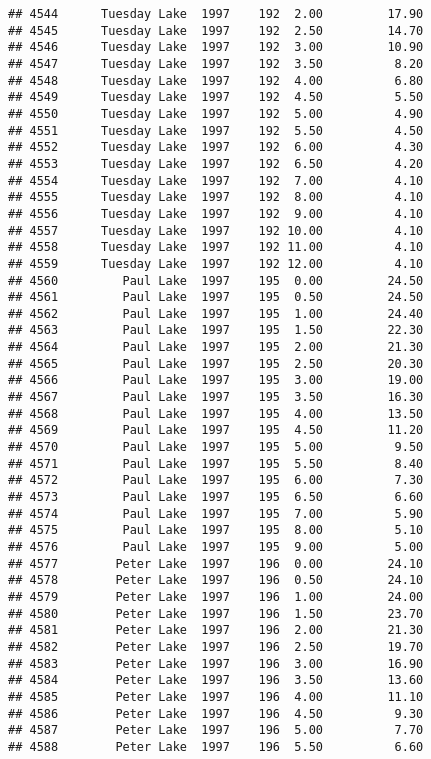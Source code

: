 \documentclass[
]{article}
\begin{document}
\begin{verbatim}
## 4544      Tuesday Lake  1997    192  2.00         17.90
## 4545      Tuesday Lake  1997    192  2.50         14.70
## 4546      Tuesday Lake  1997    192  3.00         10.90
## 4547      Tuesday Lake  1997    192  3.50          8.20
## 4548      Tuesday Lake  1997    192  4.00          6.80
## 4549      Tuesday Lake  1997    192  4.50          5.50
## 4550      Tuesday Lake  1997    192  5.00          4.90
## 4551      Tuesday Lake  1997    192  5.50          4.50
## 4552      Tuesday Lake  1997    192  6.00          4.30
## 4553      Tuesday Lake  1997    192  6.50          4.20
## 4554      Tuesday Lake  1997    192  7.00          4.10
## 4555      Tuesday Lake  1997    192  8.00          4.10
## 4556      Tuesday Lake  1997    192  9.00          4.10
## 4557      Tuesday Lake  1997    192 10.00          4.10
## 4558      Tuesday Lake  1997    192 11.00          4.10
## 4559      Tuesday Lake  1997    192 12.00          4.10
## 4560         Paul Lake  1997    195  0.00         24.50
## 4561         Paul Lake  1997    195  0.50         24.50
## 4562         Paul Lake  1997    195  1.00         24.40
## 4563         Paul Lake  1997    195  1.50         22.30
## 4564         Paul Lake  1997    195  2.00         21.30
## 4565         Paul Lake  1997    195  2.50         20.30
## 4566         Paul Lake  1997    195  3.00         19.00
## 4567         Paul Lake  1997    195  3.50         16.30
## 4568         Paul Lake  1997    195  4.00         13.50
## 4569         Paul Lake  1997    195  4.50         11.20
## 4570         Paul Lake  1997    195  5.00          9.50
## 4571         Paul Lake  1997    195  5.50          8.40
## 4572         Paul Lake  1997    195  6.00          7.30
## 4573         Paul Lake  1997    195  6.50          6.60
## 4574         Paul Lake  1997    195  7.00          5.90
## 4575         Paul Lake  1997    195  8.00          5.10
## 4576         Paul Lake  1997    195  9.00          5.00
## 4577        Peter Lake  1997    196  0.00         24.10
## 4578        Peter Lake  1997    196  0.50         24.10
## 4579        Peter Lake  1997    196  1.00         24.00
## 4580        Peter Lake  1997    196  1.50         23.70
## 4581        Peter Lake  1997    196  2.00         21.30
## 4582        Peter Lake  1997    196  2.50         19.70
## 4583        Peter Lake  1997    196  3.00         16.90
## 4584        Peter Lake  1997    196  3.50         13.60
## 4585        Peter Lake  1997    196  4.00         11.10
## 4586        Peter Lake  1997    196  4.50          9.30
## 4587        Peter Lake  1997    196  5.00          7.70
## 4588        Peter Lake  1997    196  5.50          6.60

\end{verbatim}
\end{document}
